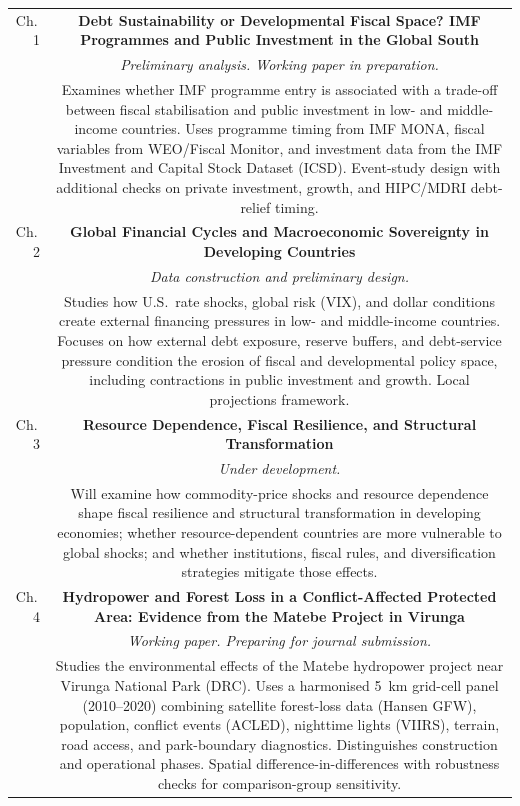 \documentclass[10pt,a4paper]{article}
\begin{document}
\begin{tabular}{@{}DC@{}}

Ch.\,1 &
  \textbf{Debt Sustainability or Developmental Fiscal Space?
  IMF Programmes and Public Investment in the Global South}\\
  & \textit{Preliminary analysis. Working paper in preparation.}\\[2pt]
  & Examines whether IMF programme entry is associated with a trade-off between fiscal
    stabilisation and public investment in low- and middle-income countries. Uses programme
    timing from IMF MONA, fiscal variables from WEO/Fiscal Monitor, and investment data from
    the IMF Investment and Capital Stock Dataset (ICSD). Event-study design with additional
    checks on private investment, growth, and HIPC/MDRI debt-relief timing.\\[5pt]

Ch.\,2 &
  \textbf{Global Financial Cycles and Macroeconomic Sovereignty
  in Developing Countries}\\
  & \textit{Data construction and preliminary design.}\\[2pt]
  & Studies how U.S.\ rate shocks, global risk (VIX), and dollar conditions create external
    financing pressures in low- and middle-income countries. Focuses on how external debt
    exposure, reserve buffers, and debt-service pressure condition the erosion of fiscal and
    developmental policy space, including contractions in public investment and growth.
    Local projections framework.\\[5pt]

Ch.\,3 &
  \textbf{Resource Dependence, Fiscal Resilience, and Structural Transformation}\\
  & \textit{Under development.}\\[2pt]
  & Will examine how commodity-price shocks and resource dependence shape fiscal resilience
    and structural transformation in developing economies; whether resource-dependent
    countries are more vulnerable to global shocks; and whether institutions, fiscal rules,
    and diversification strategies mitigate those effects.\\[5pt]

Ch.\,4 &
  \textbf{Hydropower and Forest Loss in a Conflict-Affected Protected Area:
  Evidence from the Matebe Project in Virunga}\\
  & \textit{Working paper. Preparing for journal submission.}\\[2pt]
  & Studies the environmental effects of the Matebe hydropower project near Virunga National
    Park (DRC). Uses a harmonised 5~km grid-cell panel (2010--2020) combining satellite
    forest-loss data (Hansen GFW), population, conflict events (ACLED), nighttime lights
    (VIIRS), terrain, road access, and park-boundary diagnostics. Distinguishes construction
    and operational phases. Spatial difference-in-differences with robustness checks for
    comparison-group sensitivity.\\

\end{tabular}
\end{document}
